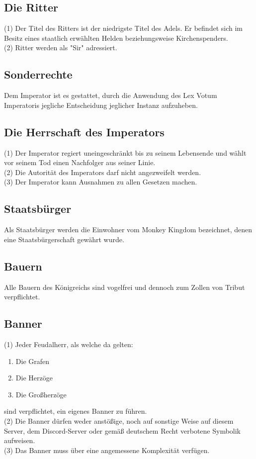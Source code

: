 \documentclass{article}
\begin{document}
\subsection{Die Ritter}
(1) Der Titel des Ritters ist der niedrigste Titel des Adels. Er befindet sich im Besitz eines staatlich erwählten Helden beziehungsweise Kirchenspenders.  \\
(2) Ritter werden als "Sir" adressiert.  

\subsection{Sonderrechte}
Dem Imperator ist es gestattet, durch die Anwendung des Lex Votum Imperatoris jegliche Entscheidung jeglicher Instanz aufzuheben.

\subsection{Die Herrschaft des Imperators}
(1) Der Imperator regiert uneingeschränkt bis zu seinem Lebensende und wählt vor seinem Tod einen Nachfolger aus seiner Linie.  \\
(2) Die Autorität des Imperators darf nicht angezweifelt werden.  \\
(3) Der Imperator kann Ausnahmen zu allen Gesetzen machen.  \\

\subsection{Staatsbürger}
Als Staatsbürger werden die Einwohner vom Monkey Kingdom bezeichnet, denen eine Staatsbürgerschaft gewährt wurde.

\subsection{Bauern}
Alle Bauern des Königreichs sind vogelfrei und dennoch zum Zollen von Tribut verpflichtet.

\subsection{Banner}
(1) Jeder Feudalherr, als welche da gelten:
\begin{enumerate}
	\item Die Grafen
	\item Die Herzöge
	\item Die Großherzöge
\end{enumerate}
sind verpflichtet, ein eigenes Banner zu führen.\\
(2) Die Banner dürfen weder anstößige, noch auf sonstige Weise auf diesem Server, dem Discord-Server oder gemäß deutschem Recht verbotene Symbolik aufweisen.\\
(3) Das Banner muss über eine angemessene Komplexität verfügen.
\end{document}
